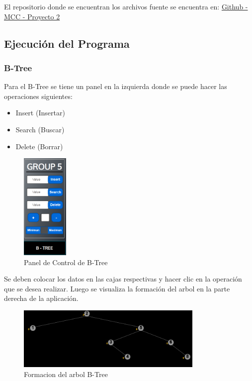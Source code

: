 \documentclass{article}
\begin{document}
	El repositorio donde se encuentran los archivos fuente se encuentra en: \href{https://github.com/AngelYvan/mcc-proyecto2-grupo5}{Github - MCC - Proyecto 2}
    	
	\subsection{Ejecución del Programa}
    \subsubsection{B-Tree}
    Para el B-Tree se tiene un panel en la izquierda donde se puede hacer las operaciones siguientes:
    \begin{itemize}
        \item Insert (Insertar)
        \item Search (Buscar)
        \item Delete (Borrar)
    \end{itemize}
    
        \begin{figure}[H]
        \centering
        \includegraphics[width=0.2\textwidth]{img/btree_cap1.PNG}
        \caption{Panel de Control de B-Tree}
        \end{figure}

    Se deben colocar los datos en las cajas respectivas y hacer clic en la operación que se desea realizar. 
    Luego se visualiza la formación del arbol en la parte derecha de la aplicación.

        \begin{figure}[H]
        \centering
        \includegraphics[width=0.8\textwidth]{img/btree_arbol.PNG}
        \caption{Formacion del arbol B-Tree}
        \end{figure}
\end{document}
